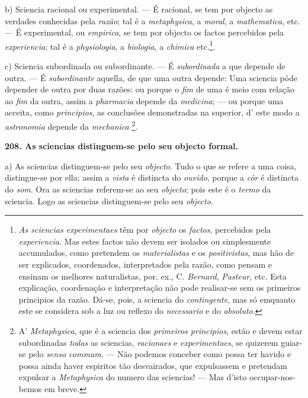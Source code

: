 b) Sciencia racional ou experimental. --- É racional, se tem por objecto as verdades conhecidas pela \emph{razão}; tal é a \emph{metaphysica}, a \emph{moral}, a \emph{mathematica}, etc. --- É experimental, ou \emph{empirica}, se tem por objecto os factos percebidos pela \emph{experiencia}; tal é a \emph{physiologia}, a \emph{biologia}, a \emph{chimica} etc.\footnote{\emph{As sciencias experimentaes} têm por \emph{objecto} os \emph{factos}, percebidos pela \emph{experiencia}. Mas estes factos não devem ser isolados ou simplesmente accumulados, como pretendem os \emph{materialistas} e os \emph{positivistas}, mas hão de ser explicados, coordenados, interpretados pela razão, como pensam e ensinam os melhores naturalistas, por. ex., C. \emph{Bernard}, \emph{Pasteur}, etc. Esta explicação, coordenação e interpretação não pode realisar-se sem os primeiros principios da razão. Dá-se, pois, a sciencia do \emph{contingente}, mas só emquanto este se considera sob a luz ou reflexo do \emph{necessario} e do \emph{absoluto}.}.

c) Sciencia subordinada ou subordinante. --- É \emph{subordinada} a que depende de outra. --- É \emph{subordinante} aquella, de que uma outra depende: Uma sciencia póde depender de outra por duas razões: ou porque o \emph{fim} de uma é meio com relação ao \emph{fim} da outra, assim a \emph{pharmacia} depende da \emph{medicina}; --- ou porque uma acceita, como \emph{principios}, as conclusões demonstradas na superior, d' este modo a \emph{astronomia} depende da \emph{mechanica} \footnote{A' \emph{Metaphysica}, que é a sciencia dos \emph{primeiros principios}, estão e devem estar subordinadas \emph{todas} as sciencias, \emph{racionaes} e \emph{experimentaes}, se quizerem guiar-se pelo \emph{senso commum}. --- Não podemos conceber como possa ter havido e possa ainda haver espiritos tão desvairados, que expulsassem e pretendam expulsar a \emph{Metaphysica} do numero das sciencias! --- Mas d'isto occupar-nos-bemos em breve.}.

\textbf{208. As sciencias distinguem-se pelo seu objecto formal.}

a) As sciencias distinguem-se pelo seu \emph{objecto}. Tudo o que se refere a uma coisa, distingue-se por ella; assim a \emph{vista} é distincta do \emph{ouvido}, porque a \emph{côr} é distincta do \emph{som}. Ora as sciencias referem-se ao seu \emph{objecto}; pois este é o \emph{termo} da sciencia. Logo as sciencias distinguem-se pelo seu \emph{objecto}.

